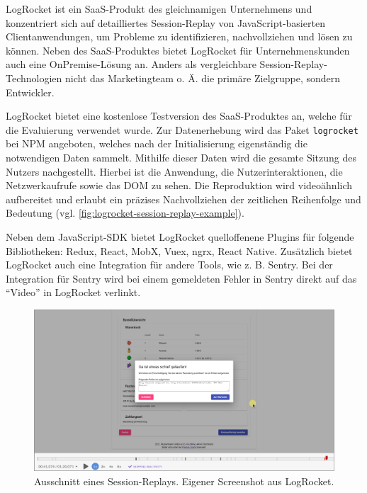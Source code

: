 LogRocket \cite{LogRocket} ist ein SaaS-Produkt des gleichnamigen Unternehmens und konzentriert sich auf detailliertes Session-Replay von JavaScript-basierten Clientanwendungen, um Probleme zu identifizieren, nachvollziehen und lösen zu können. Neben des SaaS-Produktes bietet LogRocket für Unternehmenskunden auch eine OnPremise-Lösung an. Anders als vergleichbare Session-Replay-Technologien nicht das Marketingteam o. Ä. \cite{Webalyt} die primäre Zielgruppe, sondern Entwickler.

LogRocket bietet eine kostenlose Testversion des SaaS-Produktes an, welche für die Evaluierung verwendet wurde. Zur Datenerhebung wird das Paket \texttt{logrocket} bei NPM \cite{NPM} angeboten, welches nach der Initialisierung eigenständig die notwendigen Daten sammelt. Mithilfe dieser Daten wird die gesamte Sitzung des Nutzers nachgestellt. Hierbei ist die Anwendung, die Nutzerinteraktionen, die Netzwerkaufrufe sowie das DOM zu sehen. Die Reproduktion wird videoähnlich aufbereitet und erlaubt ein präzises Nachvollziehen der zeitlichen Reihenfolge und Bedeutung (vgl. \autoref{fig:logrocket-session-replay-example}).

Neben dem JavaScript-SDK bietet LogRocket quelloffenene Plugins für folgende Bibliotheken: Redux, React, MobX, Vuex, ngrx, React Native. Zusätzlich bietet LogRocket auch eine Integration für andere Tools, wie z. B. Sentry. Bei der Integration für Sentry wird bei einem gemeldeten Fehler in Sentry direkt auf das \enquote{Video} in LogRocket verlinkt.

\begin{figure}[H]
	\centering
	\includegraphics[width=\linewidth]{img/03_methoden/logrocket_session-replay-example-cropped.png}
	\caption{Ausschnitt eines Session-Replays. Eigener Screenshot aus LogRocket.}
	\label{fig:logrocket-session-replay-example}
\end{figure}